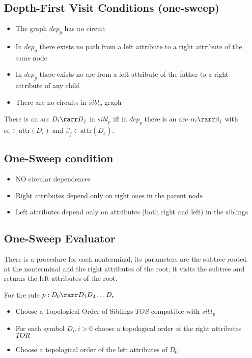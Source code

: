 \subsection{Depth-First Visit Conditions (one-sweep)}
\begin{itemize}
    \item The graph $dep_p$ has no circuit
    \item In $dep_p$ there exists no path from a left attribute to a right attribute of the same node
    \item In $dep_p$ there exists no arc from a left attribute of the father to a right attribute of any child
    \item There are no circuits in $sibl_p$ graph
\end{itemize}

There is an arc $D_i \rarr D_j$ in $sibl_p$ iff in $dep_p$ there is an arc $\alpha_i \rarr \beta_j$ with $\alpha_i \in \text{attr}(D_i)$ and $\beta_j \in \text{attr}(D_j)$.

\subsection{One-Sweep condition}

\begin{itemize}
  \item NO circular dependences
  \item Right attributes depend only on right ones in the parent node
  \item Left attributes depend only on attributes (both right and left) in the siblings
\end{itemize}

\subsection{One-Sweep Evaluator}
There is a procedure for each nonterminal, its parameters are the subtree rooted at the nonterminal and the right attributes of the root; it visits the subtree and returns the left attributes of the root.

For the rule $p: D_0 \rarr D_1D_2\ldots D_r$
\begin{itemize}
    \item Choose a Topological Order of Siblings $TOS$ compatible with $sibl_p$
    \item For each symbol $D_i, i>0$ choose a topological order of the right attributes $TOR$
    \item Choose a topological order of the left attributes of $D_0$
\end{itemize}

